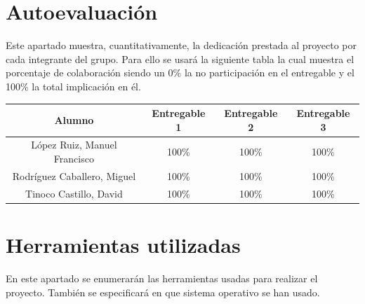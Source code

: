 \documentclass{scrartcl}
\begin{document}
\section{Autoevaluación}
Este apartado muestra, cuantitativamente, la dedicación prestada al proyecto por cada integrante del grupo. Para ello se usará la siguiente tabla la cual muestra el porcentaje de colaboración siendo un 0\% la no participación en el entregable y el 100\% la total implicación en él.
\\

\begin{tabularx}{14cm}{|c|c|c|c|}
	\hline \textbf{Alumno} & \textbf{Entregable 1} & \textbf{Entregable 2} & \textbf{Entregable 3} \\ 
	\hline 	López Ruiz, Manuel Francisco 	& 100\% & 100\%  &  100\%\\	 
	\hline  Rodríguez Caballero, Miguel		& 100\% & 100\%  &  100\%\\ 
	\hline  Tinoco Castillo, David			& 100\% & 100\%  & 100\%\\
	\hline 
\end{tabularx} 
\section{Herramientas utilizadas}\label{cap:herramientas}
En este apartado se enumerarán las herramientas usadas para realizar el proyecto. También se especificará en que sistema operativo se han usado. 
\end{document}
